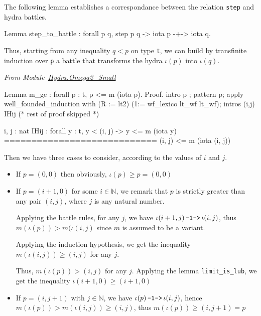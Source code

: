 The following lemma establishes a correspondance between the relation
\texttt{step} and hydra battles.

\begin{Coqsrc}
Lemma step_to_battle : forall p q, step p q -> iota p -+-> iota q.
\end{Coqsrc}


Thus, starting from any inequality $q < p$ on type \texttt{t}, we can build 
by transfinite induction over \texttt{p} a battle 
that transforms the hydra $\iota(p)$ into $\iota(q)$.

\vspace{4pt}
\emph{From Module~\href{../src/html/hydras.Hydra.Omega2_Small.html\#m_ge}{Hydra.Omega2\_Small}}

\begin{Coqsrc}
Lemma m_ge : forall p : t,   p <= m (iota p).
Proof.
  intro p ; pattern p;
    apply  well_founded_induction with 
               (R := lt2) (1:= wf_lexico lt_wf lt_wf);
     intros (i,j) IHij (* rest of proof skipped *)
\end{Coqsrc}

\begin{Coqanswer}
  i, j : nat
  IHij : forall y : t, y < (i, j) -> y <= m (iota y)
  ============================
  (i, j) <= m (iota (i, j)) 
\end{Coqanswer}


Then we have  three cases to consider, according to the values of $i$ and $j$.
\begin{itemize}
\item If $p=(0,0)$ then obviously, $\iota(p)\geq p = (0,0)$
\item If  $p=(i+1,0)$ for some $i\in\mathbb{N}$, we
 remark  that $p$ is strictly greater than any pair $ (i, j)$, where $j$ 
is any natural number.

Applying the battle rules, for any $j$, we have $\iota(i+1,j)  {\mbox{\,\texttt{-1->}\,}} \iota(i, j) $, thus $m(\iota(p)) > m(\iota(i,j)$ since  $m$ is assumed to be a variant.

Applying the induction hypothesis, we get the inequality
 $ m(\iota(i,j)) \geq (i,j)$ for any $j$. 

Thus, $m(\iota(p)) > (i,j)$ for any $j$.
Applying the lemma \texttt{limit\_is\_lub}, we get  the inequality
$\iota(i+1,0)\geq (i+1,0)$

\item If $p=(i,j+1)$ with $j\in\mathbb{N}$, we have  $\iota(p)  {\mbox{\,\texttt{-1->}\,}} \iota(i, j) $,
hence $m(\iota(p))> m(\iota(i,j)) \geq (i,j)$, thus $m(\iota(p))\geq (i,j+1)=p$

\end{itemize}

